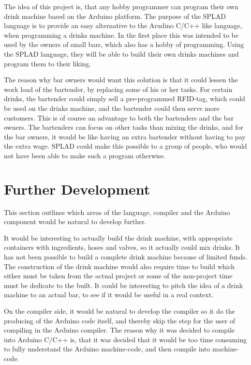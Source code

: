 The idea of this project is, that any hobby programmer can program their own drink machine based on the Arduino platform. The purpose of the SPLAD language is to provide an easy alternative to the Arudino C/C++ like language, when programming a drinks machine. In the first place this was intended to be used by the owners of small bars, which also has a hobby of programming. Using the SPLAD language, they will be able to build their own drinks machines and program them to their liking.

The reason why bar owners would want this solution is that it could lessen the work load of the bartender, by replacing some of his or her tasks. For certain drinks, the bartender could simply sell a pre-programmed RFID-tag, which could be used on the drinks machine, and the bartender could then serve more customers. This is of course an advantage to both the bartenders and the bar owners. The bartenders can focus on other tasks than mixing the drinks, and for the bar owners, it would be like having an extra bartender without having to pay the extra wage. SPLAD could make this possible to a group of people, who would not have been able to make such a program otherwise.

\section{Further Development}
This section outlines which areas of the language, compiler and the Arduino component would be natural to develop further.

It would be interesting to actually build the drink machine, with appropriate containers with ingredients, hoses and valves, so it actually could mix drinks. It has not been possible to build a complete drink machine because of limited funds. The construction of the drink machine would also require time to build which either must be taken from the actual project or some of the non-project time must be dedicate to the built. It could be interesting to pitch the idea of a drink machine to an actual bar, to see if it would be useful in a real context.

On the compiler side, it would be natural to develop the compiler so it do the producing of the Arduino code itself, and thereby skip the step for the user of compiling in the Arduino compiler. The reason why it was decided to compile into Arduino C/C++ is, that it was decided that it would be too time consuming to fully understand the Arduino machine-code, and then compile into machine-code.

